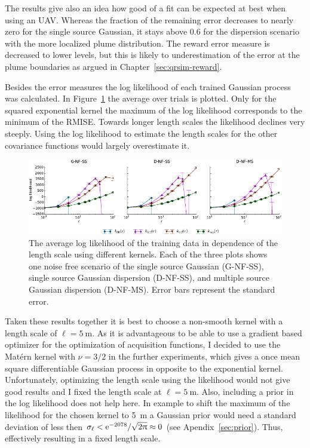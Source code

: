 The results give also an idea how good of a fit can be expected at best when 
using an UAV\@. Whereas the fraction of the remaining error decreases to nearly 
zero for the single source Gaussian, it stays above 0.6 for the dispersion 
scenario with the more localized plume distribution. The reward error measure is 
decreased to lower levels, but this is likely to underestimation of the error at 
the plume boundaries as argued in Chapter~\ref{sec:qrsim-reward}.

Besides the error measures the log likelihood of each trained Gaussian process 
was calculated. In Figure~\ref{fig:loglikelihood} the average over trials is 
plotted. Only for the squared exponential kernel the maximum of the log 
likelihood corresponds to the minimum of the RMISE\@. Towards longer length 
scales the likelihood declines very steeply. Using the log likelihood to 
estimate the length scales for the other covariance functions would largely 
overestimate it.

\begin{figure}
    \centering
    \includegraphics{plots/loglikelihood}
    \caption[Log likelihood in dependence of the kernel lengthscale]{The average 
        log likelihood of the training data in dependence of the length scale 
        using different kernels.  Each of the three plots shows one noise free 
        scenario of the single source Gaussian (G-NF-SS), single source Gaussian 
        dispersion (D-NF-SS), and multiple source Gaussian dispersion (D-NF-MS).  
        Error bars represent the standard error.}\label{fig:loglikelihood}
\end{figure}

Taken these results together it is best to choose a non-smooth kernel with 
a length scale of $\ell = \SI{5}{\meter}$. As it is advantageous to be able to 
use a gradient based optimizer for the optimization of acquisition functions, 
I decided to use the Matérn kernel with $\nu = 3/2$ in the further experiments, 
which gives a once mean square differentiable Gaussian process in opposite to 
the exponential kernel. Unfortunately, optimizing the length scale using the 
likelihood would not give good results and I fixed the length scale at $\ell 
= \SI{5}{\meter}$. Also, including a prior in the log likelihood does not help 
here. In example to shift the maximum of the likelihood for the chosen kernel to 
\SI{5}{\meter} a Gaussian prior would need a standard deviation of less then 
$\sigma_{\ell} < \mathrm{e}^{-2078} / \sqrt{2\uppi} \approx 0$ (see 
Apendix~\ref{sec:prior}).  Thus, effectively resulting in a fixed length scale.

